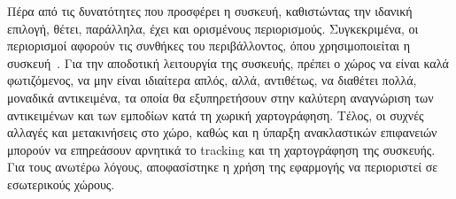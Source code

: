 Πέρα από τις δυνατότητες που προσφέρει η συσκευή, καθιστώντας την ιδανική επιλογή, θέτει, παράλληλα, έχει και ορισμένους περιορισμούς. Συγκεκριμένα, οι περιορισμοί αφορούν τις συνθήκες του περιβάλλοντος, όπου χρησιμοποιείται η συσκευή~\cite{dorreneb_2022_hololens}. 
Για την αποδοτική λειτουργία της συσκευής, πρέπει ο χώρος να είναι καλά φωτιζόμενος, να μην είναι ιδιαίτερα απλός, αλλά, αντιθέτως, να διαθέτει πολλά, μοναδικά αντικειμένα, τα οποία θα εξυπηρετήσουν στην καλύτερη αναγνώριση των αντικειμένων και των εμποδίων κατά τη χωρική χαρτογράφηση. Τέλος, οι συχνές αλλαγές και μετακινήσεις στο χώρο, καθώς και η ύπαρξη ανακλαστικών επιφανειών μπορούν να επηρεάσουν αρνητικά το tracking και τη χαρτογράφηση της συσκευής.
Για τους ανωτέρω λόγους, αποφασίστηκε η χρήση της εφαρμογής να περιοριστεί σε εσωτερικούς χώρους.

